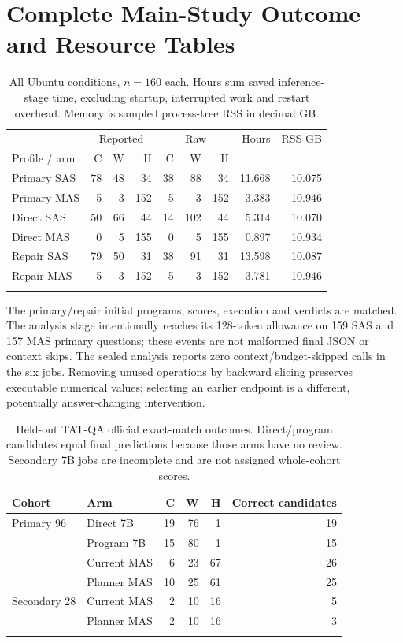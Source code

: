 \documentclass[letterpaper]{article}
\begin{document}
\section{Complete Main-Study Outcome and Resource Tables}
\begin{longtable}{lrrrrrrrr}
\toprule &\multicolumn{3}{c}{Reported}&\multicolumn{3}{c}{Raw}& Hours & RSS GB\\
Profile / arm & C&W&H&C&W&H&&\\\midrule\endhead
Primary SAS &78&48&34&38&88&34&11.668&10.075\\
Primary MAS &5&3&152&5&3&152&3.383&10.946\\
Direct SAS &50&66&44&14&102&44&5.314&10.070\\
Direct MAS &0&5&155&0&5&155&0.897&10.934\\
Repair SAS &79&50&31&38&91&31&13.598&10.087\\
Repair MAS &5&3&152&5&3&152&3.781&10.946\\
\bottomrule
\caption{All Ubuntu conditions, $n=160$ each. Hours sum saved inference-stage time, excluding startup, interrupted work and restart overhead. Memory is sampled process-tree RSS in decimal GB.}
\end{longtable}

The primary/repair initial programs, scores, execution and verdicts are matched. The analysis stage intentionally reaches its 128-token allowance on 159 SAS and 157 MAS primary questions; these events are not malformed final JSON or context skips. The sealed analysis reports zero context/budget-skipped calls in the six jobs. Removing unused operations by backward slicing preserves executable numerical values; selecting an earlier endpoint is a different, potentially answer-changing intervention.

\begin{longtable}{llrrrr}
\toprule Cohort & Arm & C & W & H & Correct candidates\\\midrule\endhead
Primary 96 & Direct 7B &19&76&1&19\\
&Program 7B&15&80&1&15\\
&Current MAS&6&23&67&26\\
&Planner MAS&10&25&61&25\\
Secondary 28&Current MAS&2&10&16&5\\
&Planner MAS&2&10&16&3\\
\bottomrule
\caption{Held-out TAT-QA official exact-match outcomes. Direct/program candidates equal final predictions because those arms have no review. Secondary 7B jobs are incomplete and are not assigned whole-cohort scores.}
\end{longtable}
\end{document}
